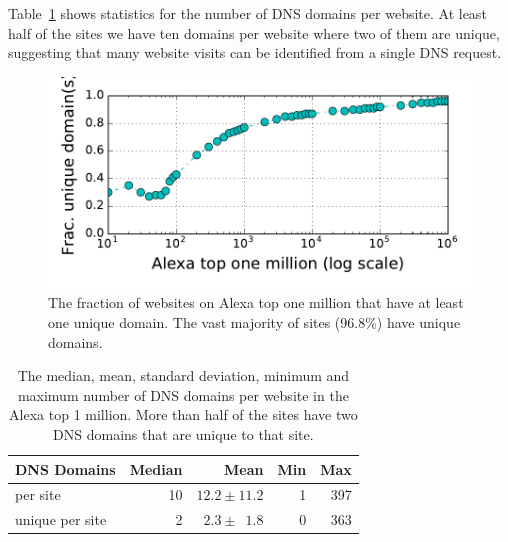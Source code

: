 Table~\ref{tab:dns-domains} shows statistics for the number of DNS domains per
website. At least half of the sites we have ten domains per website where
two of them are unique, suggesting that many website visits can be
identified from a single DNS request.

\begin{figure}[t]
	\centering
	\includegraphics[width=0.9\linewidth]{figures/dns-unique-domains.pdf}
	\caption{The fraction of websites on Alexa top one million that have at least
	one unique domain. The vast majority of sites (96.8\%) have
        unique domains.
}
	\label{fig:unique-domains}
\end{figure}

\begin{table}[t]
	\centering
	\begin{tabular}{l r r r r}
	\toprule
	\textbf{DNS Domains} & \textbf{Median} & \textbf{Mean} & \textbf{Min} & \textbf{Max} \\
	\midrule
	per site & 10 & $12.2\pm11.2$ & 1 & 397 \\
	unique per site & 2 & $2.3\pm\phantom{0}1.8$ & 0 & 363 \\
	\bottomrule
	\end{tabular}
	\caption{The median, mean, standard deviation, minimum and
          maximum number of DNS domains per website in the Alexa top 1
          million. More than half of the sites have two DNS domains that
        are unique to that site.}
	\label{tab:dns-domains}
\end{table}



